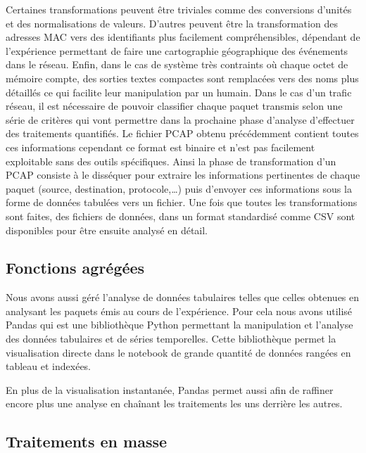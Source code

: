 Certaines transformations peuvent être triviales comme des conversions d'unités et des normalisations de valeurs. 
D'autres peuvent être la transformation des adresses \ac{MAC} vers des identifiants plus facilement compréhensibles, dépendant de l'expérience permettant de faire une cartographie géographique des événements dans le réseau.
Enfin, dans le cas de système très contraints où chaque octet de mémoire compte, des sorties textes compactes sont remplacées vers des noms plus détaillés ce qui facilite leur manipulation par un humain.
Dans le cas d'un trafic réseau, il est nécessaire de pouvoir classifier chaque paquet transmis selon une série de critères qui vont permettre dans la prochaine phase d'analyse d'effectuer des traitements quantifiés.
Le fichier \ac{PCAP} obtenu précédemment contient toutes ces informations cependant ce format est binaire et n'est pas facilement exploitable sans des outils spécifiques.
Ainsi la phase de transformation d'un \ac{PCAP} consiste à le disséquer pour extraire les informations pertinentes de chaque paquet (source, destination, protocole,\ldots) puis d'envoyer ces informations sous la forme de données tabulées vers un fichier.
Une fois que toutes les transformations sont faites, des fichiers de données, dans un format standardisé comme \ac{CSV} sont disponibles pour être ensuite analysé en détail.


\subsection{Fonctions agrégées}

Nous avons aussi géré l'analyse de données tabulaires telles que celles obtenues en analysant les paquets émis au cours de l'expérience.
Pour cela nous avons utilisé Pandas \cite{mckinney-proc-scipy-2010} qui est une bibliothèque Python permettant la manipulation et l'analyse des données tabulaires et de séries temporelles.
Cette bibliothèque permet la visualisation directe dans le notebook de grande quantité de données rangées en tableau et indexées.

En plus de la visualisation instantanée, Pandas permet aussi afin de raffiner encore plus une analyse en chaînant les traitements les uns derrière les autres.

\subsection{Traitements en masse}

